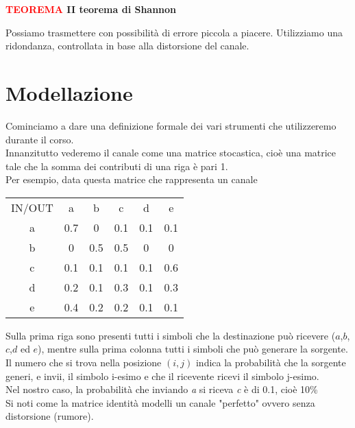 \documentclass[12pt]{report}
\begin{document}
    \vspace{5px}
    \begin{tcolorbox}
        \textbf{\textcolor{red}{TEOREMA} II teorema di Shannon}
        \vspace{5px}
        \begin{center}
            Possiamo trasmettere con possibilità di errore piccola a piacere. Utilizziamo una ridondanza, controllata in base alla distorsione del canale.
        \end{center}
    \end{tcolorbox}

    \section{Modellazione}
    Cominciamo a dare una definizione formale dei vari strumenti che utilizzeremo durante il corso.\\
    Innanzitutto vederemo il canale come una matrice stocastica, cioè una matrice tale che la somma dei contributi di una riga è pari 1.\\
    Per esempio, data questa matrice che rappresenta un canale

    \begin{center}
        \begin{tabular}{ c c c c c c }
            IN/OUT &  a & b & c & d & e  \\
            a & 0.7 & 0 & 0.1 & 0.1 & 0.1  \\
            b & 0 & 0.5 & 0.5 & 0 & 0 \\
            c & 0.1 & 0.1 & 0.1 & 0.1 & 0.6 \\
            d & 0.2 & 0.1 & 0.3 & 0.1 & 0.3   \\
            e & 0.4 & 0.2 & 0.2 & 0.1 & 0.1 \\
        \end{tabular}
    \end{center}

    Sulla prima riga sono presenti tutti i simboli che la destinazione può ricevere ($a$,$b$,$c$,$d$ ed $e$), mentre sulla prima colonna tutti i simboli che può generare la sorgente. Il numero che si trova nella posizione $(i,j)$ indica la probabilità che  la sorgente generi, e invii, il simbolo i-esimo e che il ricevente ricevi il simbolo j-esimo. \\
    Nel nostro caso,  la probabilità che inviando \textit{a} si riceva \textit{c} è di 0.1, cioè 10\% \\
    Si noti come la matrice identità modelli un canale "perfetto" ovvero senza distorsione (rumore).
    \vspace{10px}
\end{document}
